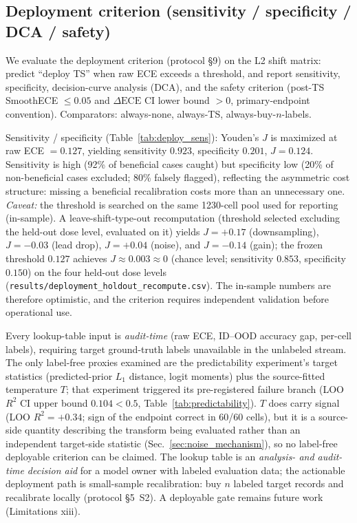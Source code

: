 \documentclass[review,12pt,nonatbib]{elsarticle}
\begin{document}
\subsection{Deployment criterion (sensitivity / specificity / DCA / safety)}
\label{sec:deployment}
We evaluate the deployment criterion (protocol \S9) on the L2 shift
matrix: predict ``deploy TS'' when raw ECE exceeds a threshold, and
report sensitivity, specificity, decision-curve analysis (DCA), and the
safety criterion (post-TS SmoothECE $\leq 0.05$ and $\Delta\text{ECE}$ CI
lower bound $>0$, primary-endpoint convention). Comparators: always-none,
always-TS, always-buy-$n$-labels.

Sensitivity / specificity (Table~\ref{tab:deploy_sens}):
Youden's $J$ is maximized at raw ECE $=0.127$, yielding sensitivity
$0.923$, specificity $0.201$, $J=0.124$. Sensitivity is high (92\% of
beneficial cases caught) but specificity low (20\% of non-beneficial
cases excluded; 80\% falsely flagged), reflecting the asymmetric cost
structure: missing a beneficial recalibration costs more than an
unnecessary one.
\emph{Caveat:} the threshold is searched on the same 1230-cell pool used
for reporting (in-sample). A leave-shift-type-out recomputation (threshold
selected excluding the held-out dose level, evaluated on it) yields
$J=+0.17$ (downsampling), $J=-0.03$ (lead drop), $J=+0.04$
(noise), and $J=-0.14$ (gain); the frozen threshold $0.127$ achieves
$J\approx 0.003\approx 0$ (chance level; sensitivity $0.853$,
specificity $0.150$) on the four held-out dose levels
(\texttt{results/deployment\_holdout\_recompute.csv}). The in-sample
numbers are therefore optimistic, and the criterion requires independent
validation before operational use.

Every lookup-table input is
\emph{audit-time} (raw ECE, ID--OOD accuracy gap, per-cell labels),
requiring target ground-truth labels unavailable in the unlabeled stream. The only label-free proxies examined are the predictability
experiment's target statistics (predicted-prior $L_1$ distance, logit
moments) plus the source-fitted temperature $T$; that experiment
triggered its pre-registered failure branch
(LOO $R^2$ CI upper bound $0.104 < 0.5$, Table~\ref{tab:predictability}).
$T$ does carry signal (LOO $R^2 = +0.34$; sign of the endpoint correct
in 60/60 cells), but it is a source-side quantity describing the
transform being evaluated rather than an independent target-side
statistic (Sec.~\ref{sec:noise_mechanism}), so no label-free deployable
criterion can be claimed. The lookup table is
an \emph{analysis- and audit-time decision aid} for a model owner with
labeled evaluation data; the actionable deployment path is small-sample
recalibration: buy $n$ labeled target records and recalibrate locally
(protocol \S5~S2). A deployable gate remains future work
(Limitations xiii).
\end{document}
